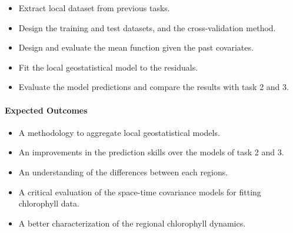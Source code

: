 \begin{itemize}
  \item Extract local dataset from previous tasks.
  \item Design the training and test datasets, and the cross-validation method.
  \item Design and evaluate the mean function given the past covariates.
  \item Fit the local geostatistical model to the residuals.
  \item Evaluate the model predictions and compare the results with task 2 and 3.
\end{itemize}

\paragraph{Expected Outcomes}

\begin{itemize}
\item A methodology to aggregate local geostatistical models.
\item An improvements in the prediction skills over the models of task 2 and 3.
\item An understanding of the differences between each regions.
\item A critical evaluation of the space-time covariance models for fitting chlorophyll data.
\item A better characterization of the regional chlorophyll dynamics.
\end{itemize}
